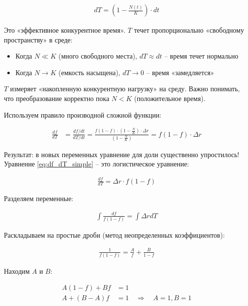 \documentclass[a4paper, 14pt]{extarticle}
\begin{document}
\begin{align}
    dT = \left(1 - \frac{N(t)}{K}\right) \cdot dt \label{eq:dT_def}
\end{align}

Это «эффективное конкурентное время». $T$ течет пропорционально «свободному пространству» в среде:
\begin{itemize}
    \item Когда $N \ll K$ (много свободного места), $dT \approx dt$ -- время течет нормально
    \item Когда $N \to K$ (емкость насыщена), $dT \to 0$ -- время «замедляется»
\end{itemize}

$T$ измеряет «накопленную конкурентную нагрузку» на среду. Важно понимать, что преобразование корректно пока $N < K$ (положительное время).

Используем правило производной сложной функции:

\begin{align}
    \frac{df}{dT} &= \frac{df/dt}{dT/dt} = \frac{f(1-f) \cdot \left(1 - \frac{N}{K}\right) \cdot \Delta r}{\left(1 - \frac{N}{K}\right)} \nonumber = f(1-f) \cdot \Delta r \label{eq:df_dT_simple}
\end{align}

Результат: в новых переменных уравнение для доли существенно упростилось! Уравнение \eqref{eq:df_dT_simple} -- это логистическое уравнение:

\begin{align}
    \frac{df}{dT} = \Delta r \cdot f(1-f) \label{eq:logistic_T}
\end{align}

Разделяем переменные:

\begin{align}
    \int \frac{df}{f(1-f)} = \int \Delta r  dT \label{eq:separation}
\end{align}

Раскладываем на простые дроби (метод неопределенных коэффициентов):

\begin{align}
    \frac{1}{f(1-f)} = \frac{A}{f} + \frac{B}{1-f} \label{eq:partial_fractions}
\end{align}

Находим $A$ и $B$:

\begin{align}
    A(1-f) + Bf &= 1 \nonumber \\
    A + (B-A)f &= 1 \quad \Rightarrow \quad A = 1, B = 1 \label{eq:coeffs_AB}
\end{align}
\end{document}

